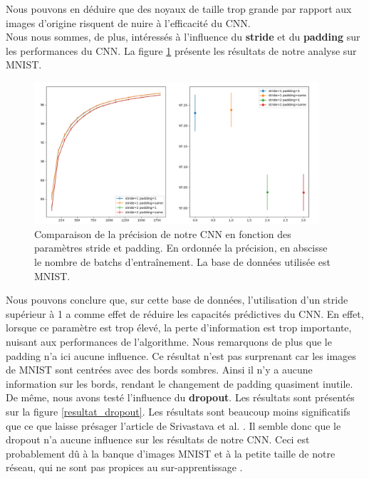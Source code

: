 Nous pouvons en déduire que des noyaux de taille trop grande par rapport aux images d'origine risquent de nuire à l'efficacité du CNN. \\

Nous nous sommes, de plus, intéressés à l'influence du \textbf{stride} et du \textbf{padding} sur les performances du CNN. La figure \ref{resultat_padding_stride} présente les résultats de notre analyse sur MNIST.

\begin{figure}[!h]
\centering
\includegraphics[width=300pt]{images/cnn/CNN_padding_stride.png}
\caption{Comparaison de la précision de notre CNN en fonction des paramètres stride et padding. En ordonnée la précision, en abscisse le nombre de batchs d’entraînement. La base de données utilisée est MNIST.}
\label{resultat_padding_stride}
\end{figure}

Nous pouvons conclure que, sur cette base de données, l'utilisation d'un stride supérieur à 1 a comme effet de réduire les capacités prédictives du CNN. En effet, lorsque ce paramètre est trop élevé, la perte d'information est trop importante, nuisant aux performances de l'algorithme. Nous remarquons de plus que le padding n'a ici aucune influence. Ce résultat n'est pas surprenant car les images de MNIST sont centrées avec des bords sombres. Ainsi il n'y a aucune information sur les bords, rendant le changement de padding quasiment inutile. \\

De même, nous avons testé l'influence du \textbf{dropout}. Les résultats sont présentés sur la figure \ref{resultat_dropout}. Les résultats sont beaucoup moins significatifs que ce que laisse présager l'article de Srivastava et al. \cite{srivastava_dropout_nodate}. Il semble donc que le dropout n'a aucune influence sur les résultats de notre CNN. Ceci est probablement dû à la banque d'images MNIST et à la petite taille de notre réseau, qui ne sont pas propices au sur-apprentissage .
  
